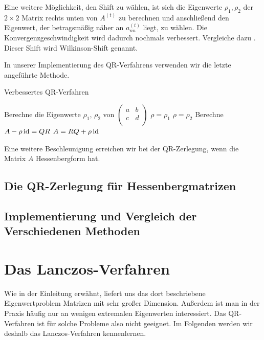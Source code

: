 \documentclass{article}
\begin{document}
Eine weitere Möglichkeit, den Shift zu wählen, ist sich die Eigenwerte $\rho_1, \rho_2$ der $2 \times 2$ Matrix rechts unten von $A^{(t)}$ zu berechnen und anschließend den Eigenwert, der betragsmäßig näher an $a^{(t)}_{nn}$ liegt, zu wählen. Die Konvergenzgeschwindigkeit wird dadurch nochmals verbessert. Vergleiche dazu \cite{Nannen-Skript}. Dieser Shift wird Wilkinson-Shift genannt.

In unserer Implementierung des QR-Verfahrens verwenden wir die letzte angeführte Methode.

\begin{algorithm}
	\label{QR-Verfahren_shifts}
	\caption{Verbessertes QR-Verfahren}
	\begin{algorithmic}[1]
		\State Berechne die Eigenwerte $\rho_1$, $\rho_2$ von $\left(\begin{array}{rr}
			a&b\\
			c&d\\
		\end{array}\right)$
		\State $\rho = \rho_1$
		\Else
		\State $\rho = \rho_2$
		\EndIf
		\State Berechne $A - \rho \operatorname{id} = QR$
		\State $A = RQ + \rho \operatorname{id}$
		\EndWhile
		\EndFor
	\end{algorithmic}
\end{algorithm}

Eine weitere Beschleunigung erreichen wir bei der QR-Zerlegung, wenn die Matrix $A$ Hessenbergform hat.

\subsection{Die QR-Zerlegung für Hessenbergmatrizen}

\subsection{Implementierung und Vergleich der Verschiedenen Methoden}


\section{Das Lanczos-Verfahren}

Wie in der Einleitung erwähnt, liefert uns das dort beschriebene Eigenwertproblem Matrizen mit sehr großer Dimension. Außerdem ist man in der Praxis häufig nur an wenigen extremalen Eigenwerten interessiert. Das QR-Verfahren ist für solche Probleme also nicht geeignet. Im Folgenden werden wir deshalb das Lanczos-Verfahren kennenlernen.
\end{document}
